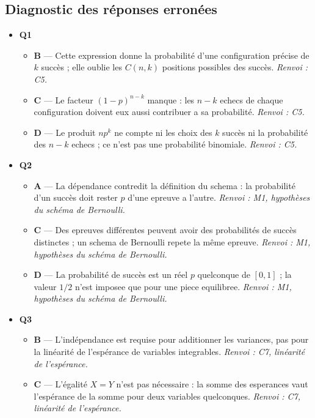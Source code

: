 \subsection*{Diagnostic des réponses erronées}

\begin{itemize}
  \item \textbf{Q1}
  \begin{itemize}
    \item \textbf{B} — Cette expression donne la probabilité d'une configuration précise de $k$ succès ; elle oublie les $C(n,k)$ positions possibles des succès. \emph{Renvoi : C5.}
    \item \textbf{C} — Le facteur $(1-p)^{n-k}$ manque : les $n-k$ echecs de chaque configuration doivent eux aussi contribuer a sa probabilité. \emph{Renvoi : C5.}
    \item \textbf{D} — Le produit $np^k$ ne compte ni les choix des $k$ succès ni la probabilité des $n-k$ echecs ; ce n'est pas une probabilité binomiale. \emph{Renvoi : C5.}
  \end{itemize}
  \item \textbf{Q2}
  \begin{itemize}
    \item \textbf{A} — La dépendance contredit la définition du schema : la probabilité d'un succès doit rester $p$ d'une epreuve a l'autre. \emph{Renvoi : M1, hypothèses du schéma de Bernoulli.}
    \item \textbf{C} — Des epreuves différentes peuvent avoir des probabilités de succès distinctes ; un schema de Bernoulli repete la même epreuve. \emph{Renvoi : M1, hypothèses du schéma de Bernoulli.}
    \item \textbf{D} — La probabilité de succès est un réel $p$ quelconque de $[0,1]$ ; la valeur $1/2$ n'est imposee que pour une piece equilibree. \emph{Renvoi : M1, hypothèses du schéma de Bernoulli.}
  \end{itemize}
  \item \textbf{Q3}
  \begin{itemize}
    \item \textbf{B} — L'indépendance est requise pour additionner les variances, pas pour la linéarité de l'espérance de variables integrables. \emph{Renvoi : C7, linéarité de l'espérance.}
    \item \textbf{C} — L'égalité $X=Y$ n'est pas nécessaire : la somme des esperances vaut l'espérance de la somme pour deux variables quelconques. \emph{Renvoi : C7, linéarité de l'espérance.}

\end{itemize}
\end{itemize}
